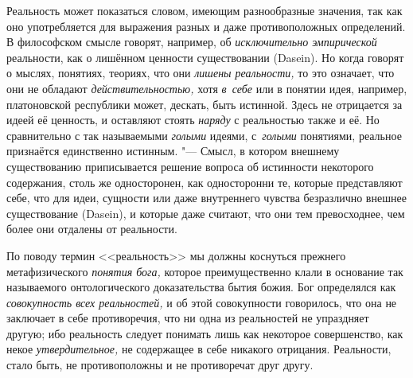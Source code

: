 
\label{bkm:bm73a}Реальность может показаться словом, имеющим разнообразные
значения, так как оно употребляется для выражения разных и даже противоположных
определений. В философском смысле говорят, например, об {\em исключительно
эмпирической} реальности, как о лишённом ценности существовании (Dasein). Но
когда говорят о мыслях, понятиях, теориях, что они {\em лишены реальности,} то
это означает, что они не обладают {\em действительностью,} хотя {\em в~себе}
или в понятии идея, например, платоновской республики может, дескать, быть
истинной. Здесь не отрицается за идеей её ценность, и оставляют стоять
{\em наряду} с реальностью также и её. Но сравнительно с так называемыми
{\em голыми} идеями, с~{\em голыми} понятиями, реальное признаётся единственно
истинным. "--- Смысл, в котором внешнему существованию приписывается решение
вопроса об истинности некоторого содержания, столь же односторонен, как
односторонни те, которые представляют себе, что для идеи, сущности или даже
внутреннего чувства безразлично внешнее существование (Dasein), и которые даже
считают, что они тем превосходнее, чем более они отдалены от реальности.

По поводу термин <<реальность>> мы должны коснуться прежнего метафизического
{\em понятия бога,} которое преимущественно клали в основание так называемого
онтологического доказательства бытия божия. Бог определялся как
{\em совокупность всех реальностей,} и об этой совокупности говорилось, что она
не заключает в себе противоречия, что ни одна из реальностей не упраздняет
другую; ибо реальность следует понимать лишь как некоторое совершенство, как
некое {\em утвердительное,} не содержащее в себе никакого отрицания.
Реальности, стало быть, не противоположны и не противоречат друг другу.

